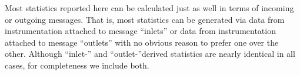 Most statistics reported here can be calculated just as well in terms of incoming or outgoing messages.
That is, most statistics can be generated via data from instrumentation attached to message ``inlets'' or data from instrumentation attached to message ``outlets'' with no obvious reason to prefer one over the other.
Although ``inlet-'' and ``outlet-''derived statistics are nearly identical in all cases, for completeness we include both.
